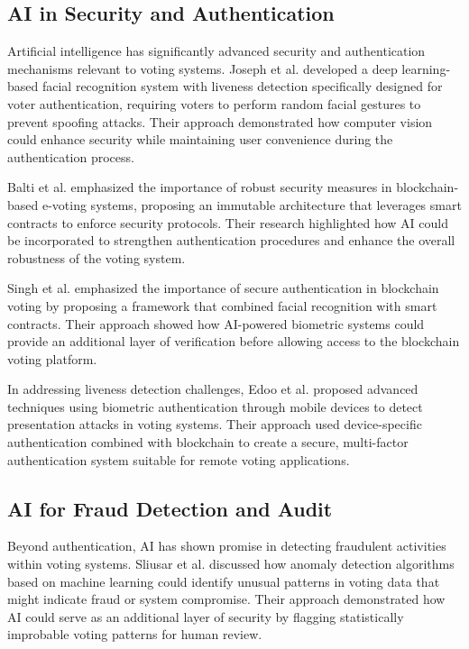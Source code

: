 \documentclass[conference]{IEEEtran}
\begin{document}
\subsection{AI in Security and Authentication}
Artificial intelligence has significantly advanced security and authentication mechanisms relevant to voting systems. Joseph et al. \cite{b6} developed a deep learning-based facial recognition system with liveness detection specifically designed for voter authentication, requiring voters to perform random facial gestures to prevent spoofing attacks. Their approach demonstrated how computer vision could enhance security while maintaining user convenience during the authentication process.

Balti et al. \cite{b2} emphasized the importance of robust security measures in blockchain-based e-voting systems, proposing an immutable architecture that leverages smart contracts to enforce security protocols. Their research highlighted how AI could be incorporated to strengthen authentication procedures and enhance the overall robustness of the voting system.

Singh et al. \cite{b5} emphasized the importance of secure authentication in blockchain voting by proposing a framework that combined facial recognition with smart contracts. Their approach showed how AI-powered biometric systems could provide an additional layer of verification before allowing access to the blockchain voting platform.

In addressing liveness detection challenges, Edoo et al. \cite{b7} proposed advanced techniques using biometric authentication through mobile devices to detect presentation attacks in voting systems. Their approach used device-specific authentication combined with blockchain to create a secure, multi-factor authentication system suitable for remote voting applications.

\subsection{AI for Fraud Detection and Audit}
Beyond authentication, AI has shown promise in detecting fraudulent activities within voting systems. Sliusar et al. \cite{b4} discussed how anomaly detection algorithms based on machine learning could identify unusual patterns in voting data that might indicate fraud or system compromise. Their approach demonstrated how AI could serve as an additional layer of security by flagging statistically improbable voting patterns for human review.
\end{document}
